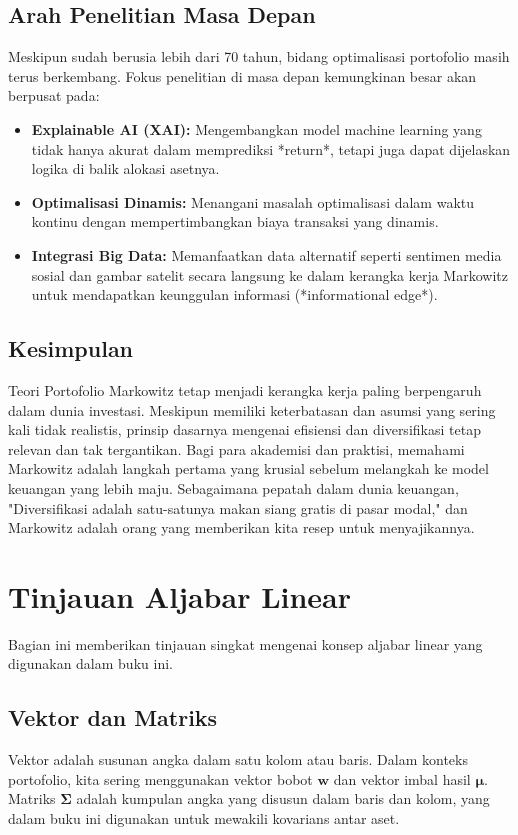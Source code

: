 \documentclass[12pt,a4paper]{book}
\begin{document}
\section{Arah Penelitian Masa Depan}
Meskipun sudah berusia lebih dari 70 tahun, bidang optimalisasi portofolio masih terus berkembang. Fokus penelitian di masa depan kemungkinan besar akan berpusat pada:
\begin{itemize}
    \item \textbf{Explainable AI (XAI):} Mengembangkan model machine learning yang tidak hanya akurat dalam memprediksi *return*, tetapi juga dapat dijelaskan logika di balik alokasi asetnya.
    \item \textbf{Optimalisasi Dinamis:} Menangani masalah optimalisasi dalam waktu kontinu dengan mempertimbangkan biaya transaksi yang dinamis.
    \item \textbf{Integrasi Big Data:} Memanfaatkan data alternatif seperti sentimen media sosial dan gambar satelit secara langsung ke dalam kerangka kerja Markowitz untuk mendapatkan keunggulan informasi (*informational edge*).
\end{itemize}

\section{Kesimpulan}
Teori Portofolio Markowitz tetap menjadi kerangka kerja paling berpengaruh dalam dunia investasi. Meskipun memiliki keterbatasan dan asumsi yang sering kali tidak realistis, prinsip dasarnya mengenai efisiensi dan diversifikasi tetap relevan dan tak tergantikan. Bagi para akademisi dan praktisi, memahami Markowitz adalah langkah pertama yang krusial sebelum melangkah ke model keuangan yang lebih maju. Sebagaimana pepatah dalam dunia keuangan, "Diversifikasi adalah satu-satunya makan siang gratis di pasar modal," dan Markowitz adalah orang yang memberikan kita resep untuk menyajikannya.

\appendix

\chapter{Tinjauan Aljabar Linear}
Bagian ini memberikan tinjauan singkat mengenai konsep aljabar linear yang digunakan dalam buku ini.

\section{Vektor dan Matriks}
Vektor adalah susunan angka dalam satu kolom atau baris. Dalam konteks portofolio, kita sering menggunakan vektor bobot $\mathbf{w}$ dan vektor imbal hasil $\mathbf{\mu}$. Matriks $\mathbf{\Sigma}$ adalah kumpulan angka yang disusun dalam baris dan kolom, yang dalam buku ini digunakan untuk mewakili kovarians antar aset.
\end{document}
